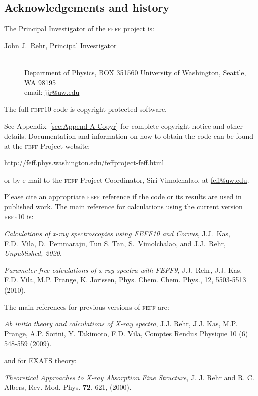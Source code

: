 \documentclass[11pt,oneside]{report} %
\newcommand{\feffcurrent}{\textsc{feff10}}
\renewcommand{\htmladdnormallink}[2]{\href{#2}{#1}}
\newcommand{\program}[1]{\textsc{#1}}
\newcommand{\feff}{\program{feff}}
\begin{document}
\begin{latexonly}
\section{Acknowledgements and history}
\label{Acknowledgements}

The Principal Investigator of the {\feff} project is:
\begin{description}
\item[John J.~Rehr, Principal Investigator]\hfill\\
Department of Physics, BOX 351560 University of Washington, Seattle, WA 98195\\
email: \htmladdnormallink{jjr@uw.edu}
{mailto:jjr@phys.washington.edu}\\
\end{description}


The full {\feffcurrent} code is copyright protected software.

See Appendix~\ref{sec:Append-A-Copyr} for
complete copyright notice and other details. Documentation and
information on how to obtain the code can be found at the {\feff}
Project website:

\centerline{\htmladdnormallink{http://feff.phys.washington.edu/feffproject-feff.html}
  {http://feff.phys.washington.edu/feffproject-feff.html}}

\noindent or by e-mail to the {\feff} Project Coordinator, Siri Vimolchalao, at
\htmladdnormallink{feff@uw.edu}{mailto:feff@uw.edu}.

Please cite an appropriate {\feff} reference if the code
or its results are used in published work. The main reference for calculations using the current version {\feffcurrent}  is:

\emph{Calculations of x-ray spectroscopies using FEFF10 and Corvus},
J.J.\ Kas, F.D.\ Vila, D.\ Pemmaraju, Tun S. Tan, S.\ Vimolchalao,
and J.J.\ Rehr, {\it Unpublished, 2020}.

\emph{Parameter-free calculations of x-ray spectra with FEFF9},
J.J. Rehr, J.J. Kas, F.D. Vila, M.P. Prange, K. Jorissen,
Phys. Chem. Chem. Phys., 12, 5503-5513 (2010).

The main references for previous versions of {\feff} are:

\emph{Ab initio theory and calculations of X-ray spectra},
 J.J. Rehr, J.J. Kas, M.P. Prange, A.P. Sorini, Y. Takimoto, F.D. Vila, Comptes Rendus Physique 10 (6) 548-559 (2009).
 
and for EXAFS theory:

\emph{Theoretical Approaches to X-ray Absorption Fine Structure},
J. J. Rehr and R. C. Albers, Rev. Mod. Phys. {\bf72}, 621, (2000).
 

\end{latexonly}
\end{document}
